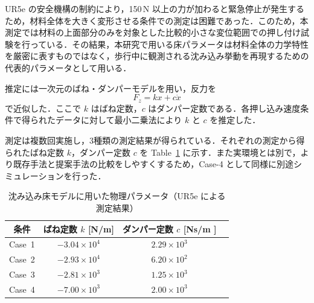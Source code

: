 UR5e の安全機構の制約により，150\,N 以上の力が加わると緊急停止が発生するため，材料全体を大きく変形させる条件での測定は困難であった．このため，本測定では材料の上面部分のみを対象とした比較的小さな変位範囲での押し付け試験を行っている．その結果，本研究で用いる床パラメータは材料全体の力学特性を厳密に表すものではなく，歩行中に観測される沈み込み挙動を再現するための代表的パラメータとして用いる．

推定には一次元のばね・ダンパーモデルを用い，反力を
\begin{equation}
  F_z = k x + c \dot{x}
  \label{eq:ground_kc_model}
\end{equation}
で近似した．ここで $k$ はばね定数，$c$ はダンパー定数である．各押し込み速度条件で得られたデータに対して最小二乗法により $k$ と $c$ を推定した．

測定は複数回実施し，3種類の測定結果が得られている．それぞれの測定から得られたばね定数 $k$，ダンパー定数 $c$ を Table~\ref{tab:soft_ground_params} に示す．また実環境とは別で，より既存手法と提案手法の比較をしやすくするため，Case-4 として同様に別途シミュレーションを行った．

\begin{table}[t]
  \centering
  \caption{沈み込み床モデルに用いた物理パラメータ（UR5e による測定結果）}
  \label{tab:soft_ground_params}
  \begin{tabular}{c c c c}
    \hline
    条件 & ばね定数 $k$ [N/m] & ダンパー定数 $c$ [Ns/m ]\\
    \hline
    Case~1 & $-3.04\times10^{4}$ & $2.29\times10^{3}$ \\
    Case~2 & $-2.93\times10^{4}$ & $6.20\times10^{2}$ \\
    Case~3 & $-2.81\times10^{3}$ & $1.25\times10^{3}$ \\
    Case~4 & $-7.00\times10^{3}$ & $2.00\times10^{3}$ \\
    \hline
  \end{tabular}
\end{table}